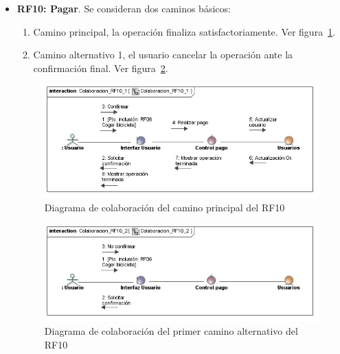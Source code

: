 \begin{itemize}
	\FloatBarrier
	\item \textbf{RF10: Pagar}. Se consideran dos caminos básicos: 
	\begin{enumerate}
		\item Camino principal, la operación finaliza satisfactoriamente. Ver figura~\ref{fig:diagramaColaboracion_RF10_1}.
		\item Camino alternativo 1, el usuario cancelar la operación ante la confirmación final. Ver figura~\ref{fig:diagramaColaboracion_RF10_2}.
	\end{enumerate}
	\begin{figure} [!htb]
		\centering
		\includegraphics[width=\linewidth,height=\textheight,keepaspectratio]{Images/Diagramas/04_Colaboracion_RF10_1}
		\caption{Diagrama de colaboración del camino principal del RF10}
		\label{fig:diagramaColaboracion_RF10_1}
	\end{figure}
	\begin{figure} [!htb]
		\centering
		\includegraphics[width=\linewidth,height=\textheight,keepaspectratio]{Images/Diagramas/04_Colaboracion_RF10_2}
		\caption{Diagrama de colaboración del primer camino alternativo del RF10}
		\label{fig:diagramaColaboracion_RF10_2}
	\end{figure}
	

\end{itemize}
